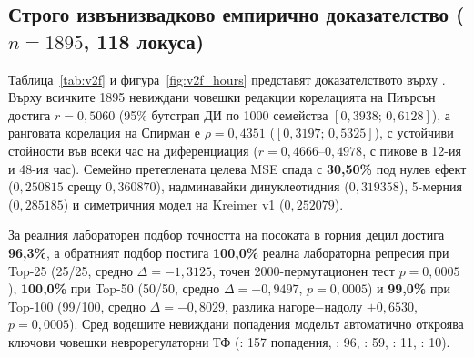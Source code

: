 \documentclass[10.5pt,a4paper]{article}
\begin{document}
\subsection{Строго извънизвадково емпирично доказателство ($n=1895$, 118 локуса)}

Таблица~\ref{tab:v2f} и фигура~\ref{fig:v2f_hours} представят доказателството върху . Върху всичките 1895 невиждани човешки редакции корелацията на Пиърсън достига \textbf{$r=0{,}5060$} (95\% бутстрап ДИ по 1000 семейства $[0{,}3938;\, 0{,}6128]$), а ранговата корелация на Спирман е \textbf{$\rho=0{,}4351$} ($[0{,}3197;\, 0{,}5325]$), с устойчиви стойности във всеки час на диференциация ($r=0{,}4666$--$0{,}4978$, с пикове в 12-ия и 48-ия час). Семейно претеглената целева MSE спада с \textbf{30,50\%} под нулев ефект ($0{,}250815$ срещу $0{,}360870$), надминавайки динуклеотидния ($0{,}319358$), 5-мерния ($0{,}285185$) и симетричния модел на Kreimer v1 ($0{,}252079$).

За реалния лабораторен подбор точността на посоката в горния децил достига \textbf{96,3\%}, а обратният подбор постига \textbf{100,0\%} реална лабораторна репресия при Top-25 (25/25, средно $\Delta=-1{,}3125$, точен 2000-пермутационен тест $p=0{,}0005$), \textbf{100,0\%} при Top-50 (50/50, средно $\Delta=-0{,}9497$, $p=0{,}0005$) и \textbf{99,0\%} при Top-100 (99/100, средно $\Delta=-0{,}8029$, разлика нагоре$-$надолу $+0{,}6530$, $p=0{,}0005$). Сред водещите невиждани попадения моделът автоматично откроява ключови човешки неврорегулаторни ТФ (: 157 попадения, : 96, : 59, : 11, : 10).
\end{document}
